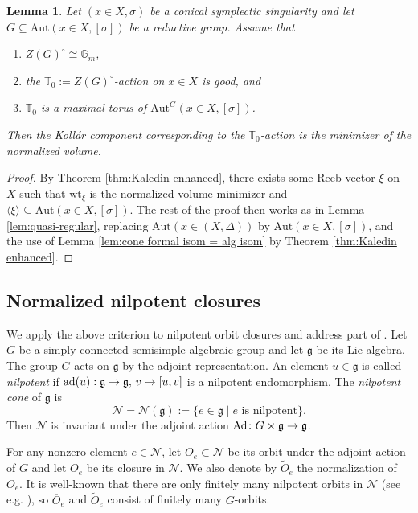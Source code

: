\documentclass[12pt]{amsart}
\newtheorem{lem}[prop]{Lemma}
\theoremstyle{definition}
\newcommand{\bT}{\mathbb{T}}
\newcommand{\bG}{\mathbb{G}}
\newcommand{\cN}{\mathcal{N}}
\newcommand{\fg}{\mathfrak g}
\newcommand{\Aut}{\mathrm{Aut}}
\newcommand{\wt}{\mathrm{wt}}
\numberwithin{equation}{section}
\begin{document}
\begin{lem} \label{lem:quasi-regular symplectic}
Let $(x\in X, \sigma)$ be a conical symplectic singularity and let $G\subseteq \Aut(x\in X,[\sigma])$ be a reductive group. Assume that
\begin{enumerate}
    \item $Z(G)^\circ\cong \bG_m$,
    \item the $\bT_0:=Z(G)^{\circ}$-action on $x\in X$ is good, and
    \item $\bT_0$ is a maximal torus of $\Aut^G(x\in X,[\sigma])$. %
\end{enumerate}
Then the Koll\'ar component corresponding to the $\bT_0$-action is the minimizer of the normalized volume.
\end{lem}

\begin{proof}
By Theorem \ref{thm:Kaledin enhanced}, there exists some Reeb vector $\xi$ on $X$ such that $\wt_\xi$ is the normalized volume minimizer and $\langle\xi\rangle\subseteq \Aut(x\in X,[\sigma])$. The rest of the proof then works as in Lemma \ref{lem:quasi-regular}, replacing $\Aut(x\in (X,\Delta))$ by $\Aut(x\in X,[\sigma])$, and the use of Lemma \ref{lem:cone formal isom = alg isom} by Theorem \ref{thm:Kaledin enhanced}.
\end{proof}

\subsection{Normalized nilpotent closures}



We apply the above criterion to nilpotent orbit closures and address part of \cite[Problem 23]{XZ-open}. Let $G$ be a simply connected semisimple algebraic group and let $\fg$ be its Lie algebra.  The  group $G$ acts on $\fg$ by the adjoint representation.  An element $u\in \fg$ is called \emph{nilpotent} if ${\rm ad}(u):\fg\to \fg,\,v\mapsto [u,v]$ is a nilpotent endomorphism.  The \emph{nilpotent cone} of $\fg$ is
\[
  \cN=\cN(\fg):=\{e\in \fg\mid e \text{ is nilpotent}\}.
\]
Then $\cN$ is invariant under the adjoint action ${\rm Ad}\colon G\times \fg\to \fg$.

For any nonzero element $e\in \cN$, let $O_{e}\subset \cN$ be its orbit under the adjoint action of $G$ and let $\overline{O}_e $ be its closure in $\cN$. We also denote by $\widetilde{O}_e$ the normalization of  $\overline{O}_e $. It is well-known that there are only finitely many nilpotent orbits in $\cN$ (see e.g. \cite[Section 3]{CM-nilpotent-orbit}), so $\overline{O}_e$ and $\widetilde{O}_e $ consist of finitely many $G$-orbits. 
\end{document}
